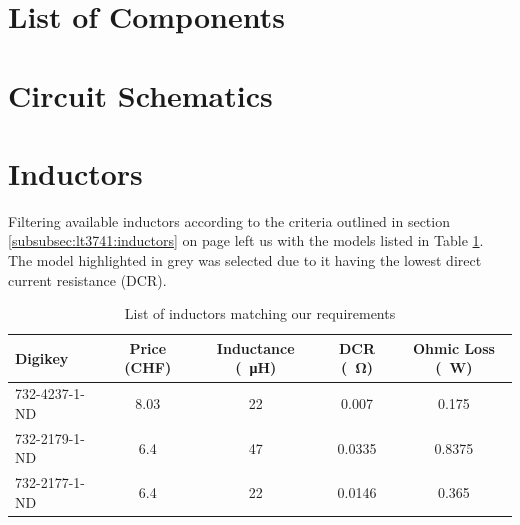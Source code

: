 \setlength\paperheight{297mm}
\setlength\paperwidth{420mm}
\setlength\pdfpageheight{\paperheight}
\setlength\pdfpagewidth{\paperwidth}

    \section{List of Components}
    \label{appendix:components}
    


    \section{Circuit Schematics}
    \label{appendix:schematics}
    

\setlength\paperheight{210mm}
\setlength\paperwidth{297mm}
\setlength\pdfpageheight{\paperheight}
\setlength\pdfpagewidth{\paperwidth}




\clearpage
\section{Inductors}
\label{appendix:inductors}

Filtering available  inductors according to  the criteria outlined  in section
\ref{subsubsec:lt3741:inductors} on  page \pageref{subsubsec:lt3741:inductors}
left us  with the models listed  in Table \ref{tab:circuit:buck:inductor}. The
model highlighted  in grey  was selected  due to it  having the  lowest direct
current resistance (DCR).

\begin{table}[th!]
    \begin{center}
        \caption{List of inductors matching our requirements}
        \label{tab:circuit:buck:inductor}
        \begin{tabular}{lcccc}
            \toprule
            Digikey         & Price (CHF) & Inductance (\SI{}{\micro\henry}) & DCR (\SI{}{\ohm}) & Ohmic Loss (\SI{}{\watt}) \\
            \midrule
            \rowcolor{lightgray}
            732-4237-1-ND   & 8.03        & 22                               & 0.007             & 0.175  \\
            732-2179-1-ND   & 6.4         & 47                               & 0.0335            & 0.8375 \\
            732-2177-1-ND   & 6.4         & 22                               & 0.0146            & 0.365  \\
            \bottomrule
        \end{tabular}
    \end{center}
\end{table}



